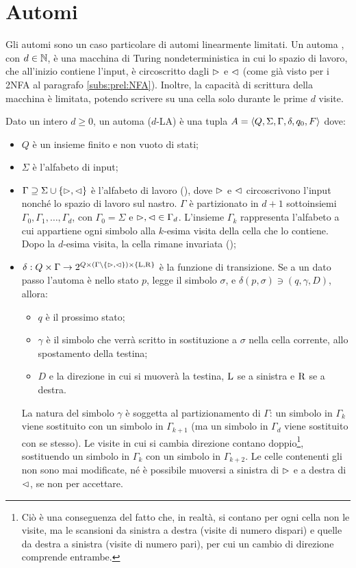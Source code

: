 \section{Automi }
Gli automi  sono un caso particolare di automi linearmente limitati. Un automa , con $d\in\mathbb N$, è una macchina di Turing nondeterministica in cui lo spazio di lavoro, che all'inizio contiene l'input, è circoscritto dagli  $\rhd$ e $\lhd$ (come già visto per i 2NFA al paragrafo \ref{subs:prel:NFA}). Inoltre, la capacità di scrittura della macchina è limitata, potendo scrivere su una cella solo durante le prime $d$ visite.
\begin{defin}
	Dato un intero $d\geq 0$, un automa  ($d$-LA) è una tupla $A=\langle Q,\Sigma,\Gamma,\delta,q_0,F \rangle$ dove:
	\begin{itemize}
		\item $Q$ è un insieme finito e non vuoto di stati;
		\item $\Sigma$ è l'alfabeto di input;
		\item $\Gamma\supseteq\Sigma\cup\left\{ \rhd,\lhd \right\}$ è l'alfabeto di lavoro (), dove $\rhd$ e $\lhd$ circoscrivono l'input nonché lo spazio di lavoro sul nastro. $\Gamma$ è partizionato in $d+1$ sottoinsiemi $\Gamma_0,\Gamma_1,\dots,\Gamma_d$, con $\Gamma_0=\Sigma$ e $\rhd,\lhd\in\Gamma_d$. L'insieme $\Gamma_k$ rappresenta l'alfabeto a cui appartiene ogni simbolo alla $k$-esima visita della cella che lo contiene. Dopo la $d$-esima visita, la cella rimane invariata ();
		\item $\delta:Q\times\Gamma\to 2^{Q\times(\Gamma\setminus\left\{ \rhd,\lhd \right\})\times\left\{ \mathrm L,\mathrm R \right\}}$ è la funzione di transizione. Se a un dato passo l'automa è nello stato $p$, legge il simbolo $\sigma$, e $\delta(p,\sigma)\ni (q,\gamma,D)$, allora:
		      \begin{itemize}
			      \item $q$ è il prossimo stato;
			      \item $\gamma$ è il simbolo che verrà scritto in sostituzione a $\sigma$ nella cella corrente, allo spostamento della testina;
			      \item $D$ e la direzione in cui si muoverà la testina, $\mathrm L$ se a sinistra e $\mathrm R$ se a destra.
		      \end{itemize}
		      La natura del simbolo $\gamma$ è soggetta al partizionamento di $\Gamma$: un simbolo in $\Gamma_k$ viene sostituito con un simbolo in $\Gamma_{k+1}$ (ma un simbolo in $\Gamma_d$ viene sostituito con se stesso). Le visite in cui si cambia direzione contano doppio\footnote{Ciò è una conseguenza del fatto che, in realtà, si contano per ogni cella non le visite, ma le scansioni da sinistra a destra (visite di numero dispari) e quelle da destra a sinistra (visite di numero pari), per cui un cambio di direzione comprende entrambe.}, sostituendo un simbolo in $\Gamma_k$ con un simbolo in $\Gamma_{k+2}$. Le celle contenenti gli  non sono mai modificate, né è possibile muoversi a sinistra di $\rhd$ e a destra di $\lhd$, se non per accettare.

\end{itemize}
\end{defin}
